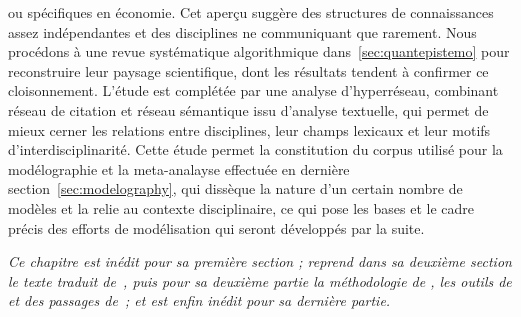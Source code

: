 ou spécifiques en économie. Cet aperçu suggère des structures de connaissances assez indépendantes et des disciplines ne communiquant que rarement. Nous procédons à une revue systématique algorithmique dans~\ref{sec:quantepistemo} pour reconstruire leur paysage scientifique, dont les résultats tendent à confirmer ce cloisonnement. L'étude est complétée par une analyse d'hyperréseau, combinant réseau de citation et réseau sémantique issu d'analyse textuelle, qui permet de mieux cerner les relations entre disciplines, leur champs lexicaux et leur motifs d'interdisciplinarité. Cette étude permet la constitution du corpus utilisé pour la modélographie et la meta-analayse effectuée en dernière section~\ref{sec:modelography}, qui dissèque la nature d'un certain nombre de modèles et la relie au contexte disciplinaire, ce qui pose les bases et le cadre précis des efforts de modélisation qui seront développés par la suite.






\stars


\textit{Ce chapitre est inédit pour sa première section ; reprend dans sa deuxième section le texte traduit de~\cite{raimbault2015models}, puis pour sa deuxième partie la méthodologie de \cite{raimbault2016indirect}, les outils de \cite{bergeaud2017classifying} et des passages de~\cite{}; et est enfin inédit pour sa dernière partie.}








